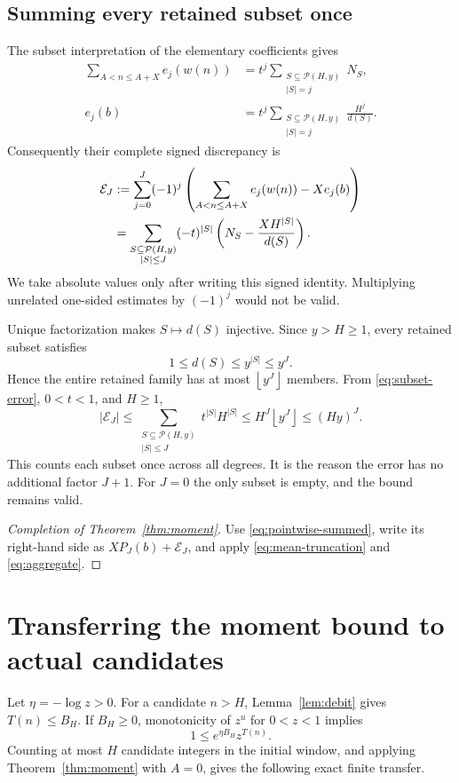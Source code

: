 \documentclass[11pt,a4paper]{article}
\theoremstyle{definition}
\theoremstyle{remark}
\numberwithin{equation}{section}
\newcommand{\Pset}{\mathcal P}
\newcommand{\floor}[1]{\left\lfloor #1\right\rfloor}
\begin{document}
\subsection{Summing every retained subset once}
The subset interpretation of the elementary coefficients gives
\begin{align}
 \sum_{A<n\le A+X} e_j(w(n))
 &=t^j\sum_{\substack{S\subseteq\Pset(H,y)\\|S|=j}}N_S,\label{eq:actual-coeff}\\
 e_j(b)&=t^j\sum_{\substack{S\subseteq\Pset(H,y)\\|S|=j}}
                  \frac{H^j}{d(S)}.\label{eq:model-coeff}
\end{align}
Consequently their complete signed discrepancy is
\begin{align}
 \mathcal E_J
 &:=\sum_{j=0}^J(-1)^j
       \left(\sum_{A<n\le A+X}e_j(w(n))-Xe_j(b)\right)\notag\\
 &=\sum_{\substack{S\subseteq\Pset(H,y)\\|S|\le J}}
          (-t)^{|S|}\left(N_S-\frac{XH^{|S|}}{d(S)}\right).\label{eq:discrepancy}
\end{align}
We take absolute values only after writing this signed identity. Multiplying
unrelated one-sided estimates by $(-1)^j$ would not be valid.

Unique factorization makes $S\mapsto d(S)$ injective. Since $y>H\ge1$, every
retained subset satisfies
\[
 1\le d(S)\le y^{|S|}\le y^J.
\]
Hence the entire retained family has at most $\floor{y^J}$ members. From
\eqref{eq:subset-error}, $0<t<1$, and $H\ge1$,
\begin{equation}\label{eq:aggregate}
 |\mathcal E_J|
 \le\sum_{\substack{S\subseteq\Pset(H,y)\\|S|\le J}}t^{|S|}H^{|S|}
 \le H^J\floor{y^J}\le(Hy)^J.
\end{equation}
This counts each subset once across all degrees. It is the reason the error has
no additional factor $J+1$. For $J=0$ the only subset is empty, and the bound
remains valid.

\begin{proof}[Completion of Theorem~\ref{thm:moment}]
Use \eqref{eq:pointwise-summed}, write its right-hand side as $XP_J(b)+\mathcal E_J$,
and apply \eqref{eq:mean-truncation} and \eqref{eq:aggregate}.
\end{proof}

\section{Transferring the moment bound to actual candidates}\label{sec:transfer}
Let $\eta=-\log z>0$. For a candidate $n>H$, Lemma~\ref{lem:debit} gives
$T(n)\le B_H$. If $B_H\ge0$, monotonicity of $z^u$ for $0<z<1$ implies
\[
 1\le e^{\eta B_H}z^{T(n)}.
\]
Counting at most $H$ candidate integers in the initial window, and applying
Theorem~\ref{thm:moment} with $A=0$, gives the following exact finite transfer.
\end{document}
